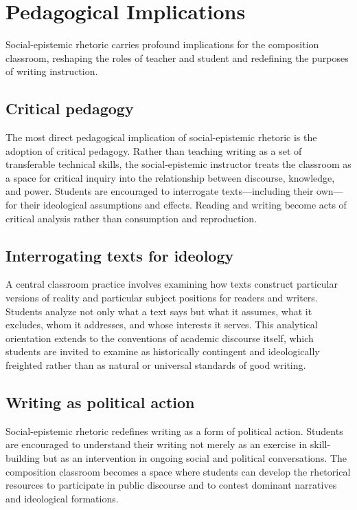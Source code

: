 \documentclass[12pt]{article}
\begin{document}
\section{Pedagogical Implications}

Social-epistemic rhetoric carries profound implications for the composition classroom, reshaping the roles of teacher and student and redefining the purposes of writing instruction.

\subsection*{Critical pedagogy}

The most direct pedagogical implication of social-epistemic rhetoric is the adoption of critical pedagogy. Rather than teaching writing as a set of transferable technical skills, the social-epistemic instructor treats the classroom as a space for critical inquiry into the relationship between discourse, knowledge, and power. Students are encouraged to interrogate texts---including their own---for their ideological assumptions and effects. Reading and writing become acts of critical analysis rather than consumption and reproduction.

\subsection*{Interrogating texts for ideology}

A central classroom practice involves examining how texts construct particular versions of reality and particular subject positions for readers and writers. Students analyze not only what a text says but what it assumes, what it excludes, whom it addresses, and whose interests it serves. This analytical orientation extends to the conventions of academic discourse itself, which students are invited to examine as historically contingent and ideologically freighted rather than as natural or universal standards of good writing.

\subsection*{Writing as political action}

Social-epistemic rhetoric redefines writing as a form of political action. Students are encouraged to understand their writing not merely as an exercise in skill-building but as an intervention in ongoing social and political conversations. The composition classroom becomes a space where students can develop the rhetorical resources to participate in public discourse and to contest dominant narratives and ideological formations.
\end{document}
